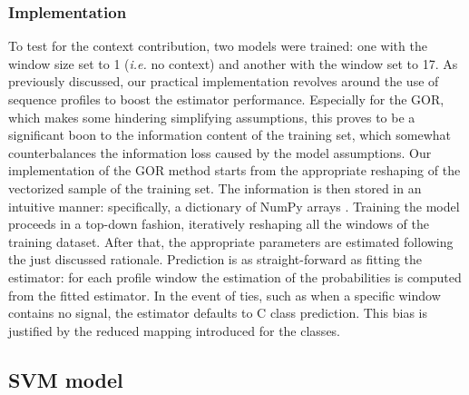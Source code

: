 \documentclass[nocrop]{bioinfo}
\begin{document}
\begin{methods}
\subsubsection*{Implementation}
To test for the context contribution, two models were trained: one with the window size set to 1 (\textit{i.e.} no context) and another with the window set to 17.
As previously discussed, our practical implementation revolves around the use of sequence profiles to boost the estimator performance.
Especially for the GOR, which makes some hindering simplifying assumptions, this proves to be a significant boon to the information content of the training set, which somewhat counterbalances the information loss caused by the model assumptions.
Our implementation of the GOR method starts from the appropriate reshaping of the vectorized sample of the training set.
The information is then stored in an intuitive manner: specifically, a dictionary of NumPy arrays \citep{harris2020array}.
Training the model proceeds in a top-down fashion, iteratively reshaping all the windows of the training dataset.
After that, the appropriate parameters are estimated following the just discussed rationale.
Prediction is as straight-forward as fitting the estimator: for each profile window the estimation of the probabilities is computed from the fitted estimator.
In the event of ties, such as when a specific window contains no signal, the estimator defaults to C class prediction.
This bias is justified by the reduced mapping introduced for the classes.

\subsection{SVM model}

\end{methods}
\end{document}
